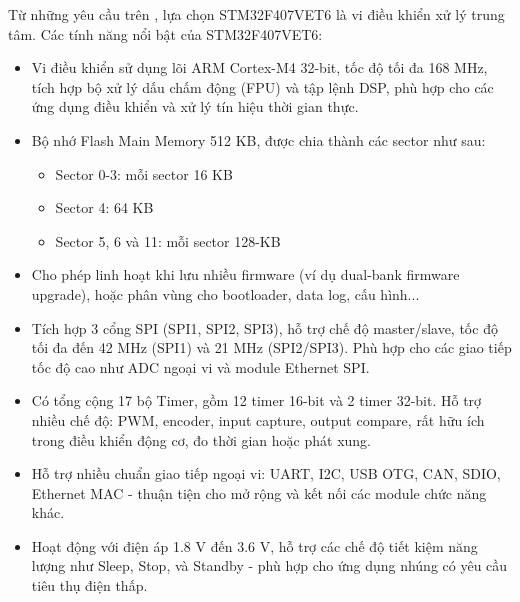 Từ những yêu cầu trên , lựa chọn STM32F407VET6 là vi điều khiển xử lý trung tâm. Các tính năng nổi bật của STM32F407VET6:

\begin{itemize}
    \item Vi điều khiển sử dụng lõi ARM Cortex-M4 32-bit, tốc độ tối đa 168 MHz, tích hợp bộ xử lý dấu chấm động (FPU) và tập lệnh DSP, phù hợp cho các ứng dụng điều khiển và xử lý tín hiệu thời gian thực.
    
    \item Bộ nhớ Flash Main Memory 512 KB, được chia thành các sector như sau:  
    
    \begin{itemize}
        \item Sector 0-3: mỗi sector 16 KB  
        \item Sector 4: 64 KB  
        \item Sector 5, 6 và 11: mỗi sector 128-KB  
    \end{itemize}

    \item Cho phép linh hoạt khi lưu nhiều firmware (ví dụ dual-bank firmware upgrade), hoặc phân vùng cho bootloader, data log, cấu hình...

    \item Tích hợp 3 cổng SPI (SPI1, SPI2, SPI3), hỗ trợ chế độ master/slave, tốc độ tối đa đến 42 MHz (SPI1) và 21 MHz (SPI2/SPI3). Phù hợp cho các giao tiếp tốc độ cao như ADC ngoại vi và module Ethernet SPI.

    \item Có tổng cộng 17 bộ Timer, gồm 12 timer 16-bit và 2 timer 32-bit. Hỗ trợ nhiều chế độ: PWM, encoder, input capture, output compare, rất hữu ích trong điều khiển động cơ, đo thời gian hoặc phát xung.

    \item Hỗ trợ nhiều chuẩn giao tiếp ngoại vi: UART, I2C, USB OTG, CAN, SDIO, Ethernet MAC - thuận tiện cho mở rộng và kết nối các module chức năng khác.

    \item Hoạt động với điện áp 1.8 V đến 3.6 V, hỗ trợ các chế độ tiết kiệm năng lượng như Sleep, Stop, và Standby - phù hợp cho ứng dụng nhúng có yêu cầu tiêu thụ điện thấp.
\end{itemize}


